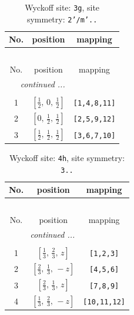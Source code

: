 \documentclass[fleqn,8pt]{jsarticle}
\begin{document}
\begin{longtable}{ccc}
\caption{Wyckoff site: {\tt 3g}, site symmetry: {\tt 2'/m'..}}
 \\
 \hline \hline
No. & position & mapping \\ \hline \endfirsthead

\multicolumn{2}{l}{\tablename\ \thetable{}} \\
 \hline \hline
No. & position & mapping \\ \hline \endhead

 \hline \hline
\multicolumn{2}{r}{\footnotesize\it continued ...} \\ \endfoot

 \hline \hline
\multicolumn{2}{r}{} \\ \endlastfoot

1 & $\left[ \frac{1}{2},\, 0,\, \frac{1}{2} \right]$ & {\tt [1,4,8,11]} \\ \hline
2 & $\left[ 0,\, \frac{1}{2},\, \frac{1}{2} \right]$ & {\tt [2,5,9,12]} \\ \hline
3 & $\left[ \frac{1}{2},\, \frac{1}{2},\, \frac{1}{2} \right]$ & {\tt [3,6,7,10]} \\
\end{longtable}
\renewcommand{\arraystretch}{1.2}
\begin{longtable}{ccc}
\caption{Wyckoff site: {\tt 4h}, site symmetry: {\tt 3..}}
 \\
 \hline \hline
No. & position & mapping \\ \hline \endfirsthead

\multicolumn{2}{l}{\tablename\ \thetable{}} \\
 \hline \hline
No. & position & mapping \\ \hline \endhead

 \hline \hline
\multicolumn{2}{r}{\footnotesize\it continued ...} \\ \endfoot

 \hline \hline
\multicolumn{2}{r}{} \\ \endlastfoot

1 & $\left[ \frac{1}{3},\, \frac{2}{3},\, z \right]$ & {\tt [1,2,3]} \\ \hline
2 & $\left[ \frac{2}{3},\, \frac{1}{3},\, - z \right]$ & {\tt [4,5,6]} \\ \hline
3 & $\left[ \frac{2}{3},\, \frac{1}{3},\, z \right]$ & {\tt [7,8,9]} \\ \hline
4 & $\left[ \frac{1}{3},\, \frac{2}{3},\, - z \right]$ & {\tt [10,11,12]} \\
\end{longtable}
\end{document}
